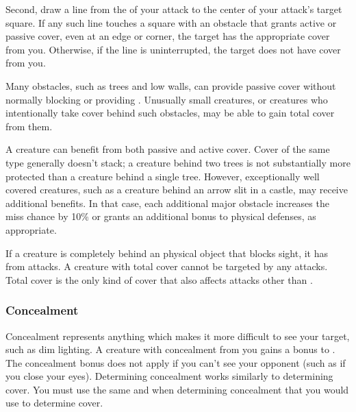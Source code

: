             Second, draw a line from the  of your attack to the center of your attack's target square.
            If any such line touches a square with an obstacle that grants active or passive cover, even at an edge or corner, the target has the appropriate cover from you.
            Otherwise, if the line is uninterrupted, the target does not have cover from you.

             Many obstacles, such as trees and low walls, can provide passive cover without normally blocking  or providing .
            Unusually small creatures, or creatures who intentionally take cover behind such obstacles, may be able to gain total cover from them.

            A creature can benefit from both passive and active cover.
            Cover of the same type generally doesn't stack; a creature behind two trees is not substantially more protected than a creature behind a single tree.
            However, exceptionally well covered creatures, such as a creature behind an arrow slit in a castle, may receive additional benefits.
            In that case, each additional major obstacle increases the miss chance by 10\% or grants an additional  bonus to physical defenses, as appropriate.

            \label{Total Cover}
            If a creature is completely behind an physical object that blocks sight, it has  from attacks.
            A creature with total cover cannot be targeted by any attacks.
            Total cover is the only kind of cover that also affects attacks other than .

        \subsubsection{Concealment}\label{Concealment}
            Concealment represents anything which makes it more difficult to see your target, such as dim lighting. A creature with concealment from you gains a  bonus to . The concealment bonus does not apply if you can't see your opponent (such as if you close your eyes).
            Determining concealment works similarly to determining cover.
            You must use the same  and  when determining concealment that you would use to determine cover.

